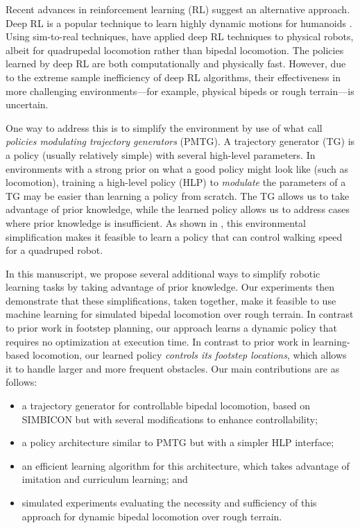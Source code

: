 \documentclass[conference]{IEEEtran}
\begin{document}
Recent advances in reinforcement learning (RL) suggest an alternative approach.
Deep RL is a popular technique to learn highly dynamic motions for humanoids \citep{peng2018deepmimic, heess2017emergence}.
Using sim-to-real techniques, \citet{tan2018sim} have applied deep RL techniques to physical robots, albeit for quadrupedal locomotion rather than bipedal locomotion.
The policies learned by deep RL are both computationally and physically fast.
However, due to the extreme sample inefficiency of deep RL algorithms, their effectiveness in more challenging environments---for example, physical bipeds or rough terrain---is uncertain.

One way to address this is to simplify the environment by use of what \citet{iscen2018pmtg} call \emph{policies modulating trajectory generators} (PMTG).
A trajectory generator (TG) is a policy (usually relatively simple) with several high-level parameters.
In environments with a strong prior on what a good policy might look like (such as locomotion),
training a high-level policy (HLP) to \emph{modulate} the parameters of a TG may be easier than learning a policy from scratch.
The TG allows us to take advantage of prior knowledge, while the learned policy allows us to address cases where prior knowledge is insufficient.
As shown in \citet{iscen2018pmtg}, this environmental simplification makes it feasible to learn a policy that can control walking speed for a quadruped robot.

In this manuscript, we propose several additional ways to simplify robotic learning tasks by taking advantage of prior knowledge.
Our experiments then demonstrate that these simplifications, taken together, make it feasible to use machine learning for simulated bipedal locomotion over rough terrain.
In contrast to prior work in footstep planning, our approach learns a dynamic policy that requires no optimization at execution time.
In contrast to prior work in learning-based locomotion, our learned policy \emph{controls its footstep locations}, which allows it to handle larger and more frequent obstacles.
Our main contributions are as follows:
\begin{itemize}
  \item a trajectory generator for controllable bipedal locomotion, based on SIMBICON \citep{yin2007simbicon} but with several modifications to enhance controllability;
  \item a policy architecture similar to PMTG but with a simpler HLP interface;
  \item an efficient learning algorithm for this architecture, which takes advantage of imitation and curriculum learning; and
  \item simulated experiments evaluating the necessity and sufficiency of this approach for dynamic bipedal locomotion over rough terrain.
\end{itemize}
\end{document}
